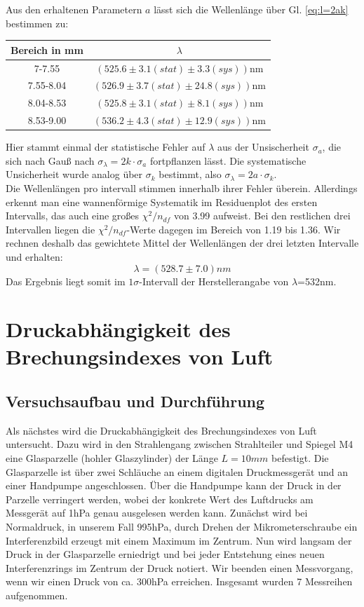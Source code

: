 \documentclass[12pt,a4paper]{article}
\begin{document}
Aus den erhaltenen Parametern $a$ lässt sich die Wellenlänge über Gl. \ref{eq:l=2ak} bestimmen zu:
\begin{center}
	\begin{tabular}{|c|c|}
		\hline 
		Bereich in mm&$\lambda$  \\ 
		\hline 
		7-7.55&$(525.6\pm3.1(stat) \pm3.3(sys))$nm \\ 
		\hline 
		7.55-8.04&$(526.9\pm3.7(stat)\pm24.8(sys))$nm\\ 
		\hline 
		8.04-8.53&$(525.8\pm3.1(stat)\pm8.1(sys)) $nm\\ 
		\hline 
		8.53-9.00&$(536.2\pm4.3(stat)\pm12.9(sys))$nm  \\ 
		\hline 
	\end{tabular}
\end{center}
Hier stammt einmal der statistische Fehler auf $\lambda$ aus der Unsischerheit $\sigma_a$, die sich nach Gauß nach $\sigma_{\lambda} = 2k \cdot \sigma_a$ fortpflanzen lässt. Die systematische Unsicherheit wurde analog über $\sigma_k$ bestimmt, also $\sigma_{\lambda} = 2a\cdot \sigma_{k}$.\\
Die Wellenlängen pro intervall stimmen innerhalb ihrer Fehler überein. Allerdings erkennt man eine wannenförmige Systematik im Residuenplot des ersten Intervalls, das auch eine großes $\chi^2/n_{df}$ von 3.99 aufweist. Bei den restlichen drei Intervallen liegen die $\chi^2/n_{df}$-Werte dagegen im Bereich von 1.19 bis 1.36. Wir rechnen deshalb das gewichtete Mittel der Wellenlängen der drei letzten Intervalle und erhalten:
\begin{equation}
\lambda=(528.7\pm7.0)nm
\end{equation} 
Das Ergebnis liegt somit im $1\sigma$-Intervall der Herstellerangabe von $\lambda$=532nm.
\section{Druckabhängigkeit des Brechungsindexes von Luft}
\subsection{Versuchsaufbau und Durchführung}
Als nächstes wird die Druckabhängigkeit des Brechungsindexes von Luft untersucht. Dazu wird in den Strahlengang zwischen Strahlteiler und Spiegel M4 eine Glasparzelle (hohler Glaszylinder) der Länge $L=10mm$ befestigt. Die Glasparzelle ist über zwei Schläuche an einem digitalen Druckmessgerät und an einer Handpumpe angeschlossen. Über die Handpumpe kann der Druck in der Parzelle verringert werden, wobei der konkrete Wert des Luftdrucks am Messgerät auf 1hPa genau ausgelesen werden kann. Zunächst wird bei Normaldruck, in unserem Fall 995hPa, durch Drehen der Mikrometerschraube ein Interferenzbild erzeugt mit einem Maximum im Zentrum. Nun wird langsam der Druck in der Glasparzelle erniedrigt und bei jeder Entstehung eines neuen Interferenzrings im Zentrum der Druck notiert. Wir beenden einen Messvorgang, wenn wir einen Druck von ca. 300hPa erreichen. Insgesamt wurden 7 Messreihen aufgenommen.
\end{document}
